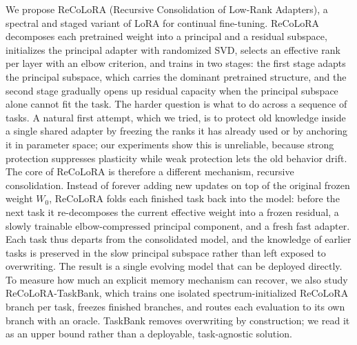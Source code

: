 \documentclass[11pt]{article}
\begin{document}
We propose ReCoLoRA (Recursive Consolidation of Low-Rank Adapters), a spectral and staged variant of LoRA for continual fine-tuning. ReCoLoRA decomposes each pretrained weight into a principal and a residual subspace, initializes the principal adapter with randomized SVD, selects an effective rank per layer with an elbow criterion, and trains in two stages: the first stage adapts the principal subspace, which carries the dominant pretrained structure, and the second stage gradually opens up residual capacity when the principal subspace alone cannot fit the task. The harder question is what to do across a sequence of tasks. A natural first attempt, which we tried, is to protect old knowledge inside a single shared adapter by freezing the ranks it has already used or by anchoring it in parameter space; our experiments show this is unreliable, because strong protection suppresses plasticity while weak protection lets the old behavior drift. The core of ReCoLoRA is therefore a different mechanism, recursive consolidation. Instead of forever adding new updates on top of the original frozen weight $W_0$, ReCoLoRA folds each finished task back into the model: before the next task it re-decomposes the current effective weight into a frozen residual, a slowly trainable elbow-compressed principal component, and a fresh fast adapter. Each task thus departs from the consolidated model, and the knowledge of earlier tasks is preserved in the slow principal subspace rather than left exposed to overwriting. The result is a single evolving model that can be deployed directly. To measure how much an explicit memory mechanism can recover, we also study ReCoLoRA-TaskBank, which trains one isolated spectrum-initialized ReCoLoRA branch per task, freezes finished branches, and routes each evaluation to its own branch with an oracle. TaskBank removes overwriting by construction; we read it as an upper bound rather than a deployable, task-agnostic solution.
\end{document}
